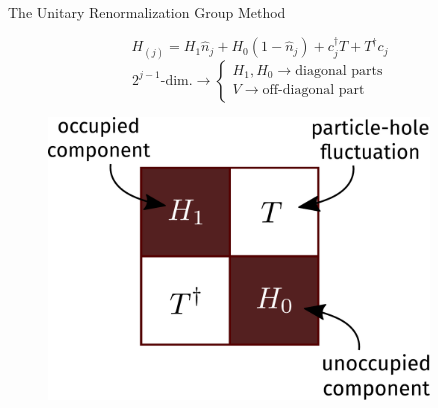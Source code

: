 \documentclass[aspectratio=169]{beamer}
\begin{document}
\begin{frame}[noframenumbering]{The Unitary Renormalization Group Method}
{\begin{minipage}{0.4\textwidth}
	\[H_{(j)} = H_1 \hat n_j + H_0 \left(1 - \hat n_j\right) + c^\dagger_j T + T^\dagger c_j\]
\[
 {2^{j-1} \text{-dim.}} \longrightarrow \begin{cases}
	H_1, H_0 \longrightarrow \text{diagonal parts}\\
V \longrightarrow \text{off-diagonal part}
\end{cases}
\]
\end{minipage}
\hspace*{\fill}
\begin{minipage}{0.5\textwidth}
\begin{figure}
	\includegraphics[width=0.9\textwidth]{figures/urg_ham.pdf}
\end{figure}
\end{minipage}
}
\end{frame}
\end{document}
